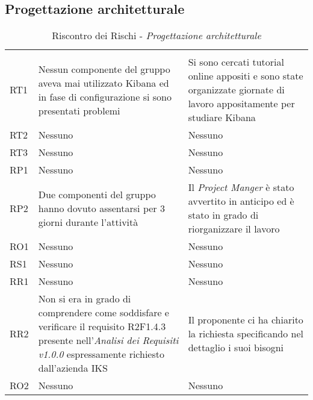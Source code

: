 \subsection{Progettazione architetturale}
\begin{table}[H]
	\centering
	\begin{tabular}{|C{2.5cm}|C{5cm}|C{5cm}|}
		 & & \\
		RT1  & Nessun componente del gruppo aveva mai utilizzato Kibana ed in fase di configurazione si sono presentati problemi & Si sono cercati tutorial online appositi e sono state organizzate giornate di lavoro appositamente per studiare Kibana \\
		\hline
		RT2  & Nessuno & Nessuno \\
		\hline
		RT3  & Nessuno & Nessuno \\
		\hline
		RP1  & Nessuno & Nessuno \\
		\hline
		RP2  & Due componenti del gruppo hanno dovuto assentarsi per 3 giorni durante l'attività & Il \textit{Project Manger} è stato avvertito in anticipo ed è stato in grado di riorganizzare il lavoro \\
		\hline
		RO1  & Nessuno & Nessuno \\
		\hline
		RS1  & Nessuno & Nessuno \\
		\hline
		RR1  & Nessuno & Nessuno \\
		\hline
		RR2  & Non si era in grado di comprendere come soddisfare e verificare il requisito R2F1.4.3 presente nell'\textit{Analisi dei Requisiti v1.0.0} espressamente richiesto dall'azienda IKS & Il proponente ci ha chiarito la richiesta specificando nel dettaglio i suoi bisogni\\
		\hline
		RO2  & Nessuno & Nessuno \\
		\hline
	\end{tabular}
	\caption{Riscontro dei Rischi - \textit{Progettazione architetturale}}
\end{table}


